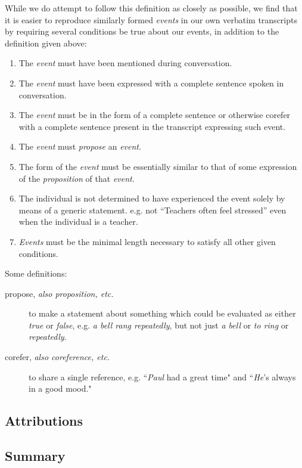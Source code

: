 \documentclass[a4paper,12pt]{article}
\begin{document}
\pagebreak
While we do attempt to follow this definition as closely as possible, we find that it is easier to reproduce similarly formed \emph{events} in our own verbatim transcripts by requiring several conditions be true about our events, in addition to the definition given above:
\begin{enumerate}
    \item The \emph{event} must have been mentioned during conversation.
    \item The \emph{event} must have been expressed with a complete sentence spoken in conversation.
    \item The \emph{event} must be in the form of a complete sentence or otherwise corefer with a complete sentence present in the transcript expressing such event.
    \item The \emph{event} must \emph{propose} an \emph{event}.
    \item The form of the \emph{event} must be essentially similar to that of some expression of the \emph{proposition} of that \emph{event}. %
    \item The individual is not determined to have experienced the event solely by means of a generic statement. e.g. not ``Teachers often feel stressed'' even when the individual is a teacher.
    \item \emph{Events} must be the minimal length necessary to satisfy all other given conditions.
\end{enumerate}
Some definitions:
\begin{description}
    \item[propose, \emph{also \emph{proposition}, etc.}] to make a statement about something which could be evaluated as either \emph{true} or \emph{false},
        e.g. \emph{a bell rang repeatedly}, but not just \emph{a bell} or \emph{to ring} or \emph{repeatedly}.
    \item[corefer, \emph{also \emph{coreference}, etc.}] to share a single reference,
        e.g. ``\emph{Paul} had a great time" and ``\emph{He}'s always in a good mood."
\end{description}

\pagebreak
\subsection{Attributions}
\subsection{Summary}
\end{document}
